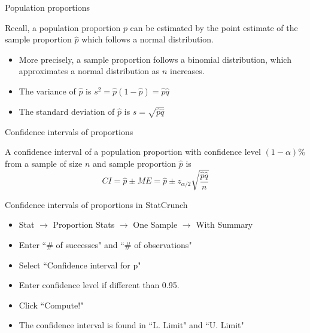 \documentclass[xcolor=table]{beamer}
\begin{document}
\begin{frame}{Population proportions}
\begin{block}{}
\large
Recall, a population proportion $p$ can be estimated by the point estimate of the sample proportion $\hat p$ which follows a normal distribution.
\begin{itemize}
\pause\item More precisely, a sample proportion follows a binomial distribution, which approximates a normal distribution as $n$ increases.
\pause\item The variance of $\hat p$ is $s^2 = \hat p (1-\hat p) = \hat p \hat q$
\pause\item The standard deviation of $\hat p$ is $s = \sqrt{\hat p \hat q}$
\end{itemize}
\end{block}
\end{frame}

\begin{frame}{Confidence intervals of proportions}
\begin{block}{}
\large
A confidence interval of a population proportion with confidence level $(1-\alpha)$\% from a sample of size $n$ and sample proportion $\hat p$ is
\[CI = \hat p \pm ME = \hat p \pm z_{\alpha/2} \sqrt{\frac {\hat p \hat q}{n}}\]
\end{block}
\end{frame}

\begin{frame}{Confidence intervals of proportions in StatCrunch}
\begin{block}{}
\begin{itemize}
\item Stat $\to$ Proportion Stats $\to$ One Sample $\to$ With Summary
\item Enter ``\# of successes" and ``\# of observations"
\item Select ``Confidence interval for p"
\item Enter confidence level if different than 0.95.
\item Click ``Compute!"
\item The confidence interval is found in ``L. Limit" and ``U. Limit"
\end{itemize}
\end{block}
\end{frame}
\end{document}
